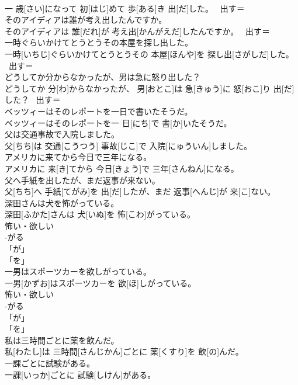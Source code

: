 \documentclass[8pt]{extreport}
\begin{document}
\begin{CJK}{UTF8}{min}
\\	一 歳[さい]になって 初[はじ]めて 歩[ある]き 出[だ]した。	~出す＝ 
\\	そのアイディアは誰が考え出したんですか。	
\\	そのアイディアは 誰[だれ]が 考え出[かんがえだ]したんですか。	~出す＝ 
\\	一時ぐらいかけてとうとうその本屋を探し出した。	
\\	一時[いちじ]ぐらいかけてとうとうその 本屋[ほんや]を 探し出[さがしだ]した。	~出す＝ 
\\	どうしてか分からなかったが、男は急に怒り出した？	
\\	どうしてか 分[わ]からなかったが、 男[おとこ]は 急[きゅう]に 怒[おこ]り 出[だ]した？	~出す＝ 
\\	ベッツィーはそのレポートを一日で書いたそうだ。	
\\	ベッツィーはそのレポートを一 日[にち]で 書[か]いたそうだ。	
\\	父は交通事故で入院しました。	
\\	父[ちち]は 交通[こうつう] 事故[じこ]で 入院[にゅういん]しました。	
\\	アメリカに来てから今日で三年になる。	
\\	アメリカに 来[き]てから 今日[きょう]で 三年[さんねん]になる。	
\\	父へ手紙を出したが、まだ返事が来ない。	
\\	父[ちち]へ 手紙[てがみ]を 出[だ]したが、まだ 返事[へんじ]が 来[こ]ない。	
\\	深田さんは犬を怖がっている。	
\\	深田[ふかた]さんは 犬[いぬ]を 怖[こわ]がっている。	
\\	怖い・欲しい 
\\	-がる 
\\	「が」
\\	「を」
\\	一男はスポーツカーを欲しがっている。	
\\	一男[かずお]はスポーツカーを 欲[ほ]しがっている。	
\\	怖い・欲しい 
\\	-がる 
\\	「が」
\\	「を」
\\	私は三時間ごとに薬を飲んだ。	
\\	私[わたし]は 三時間[さんじかん]ごとに 薬[くすり]を 飲[の]んだ。	
\\	一課ごとに試験がある。	
\\	一課[いっか]ごとに 試験[しけん]がある。	

\end{CJK}
\end{document}
